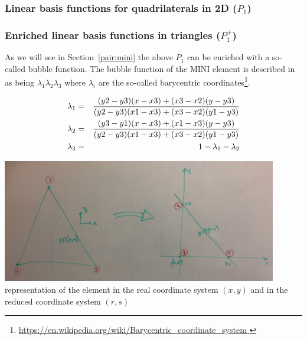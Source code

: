 \subsubsection{Linear basis functions for quadrilaterals in 2D ($P_1$)}\label{ss:lbfq2D}



\subsubsection{Enriched linear basis functions in triangles ($P_1^+$)}

As we will see in Section~\ref{pair:mini} the above $P_1$ can be enriched 
with a so-called bubble function.
The  bubble function of the MINI element 
is described in \cite{arbf84} as being $\lambda_1\lambda_2\lambda_3$
where $\lambda_i$ are the so-called barycentric 
coordinates\footnote{\url{https://en.wikipedia.org/wiki/Barycentric\_coordinate\_system }}.

\begin{eqnarray}
\lambda_1 &=& \frac{(y2-y3)(x-x3)+(x3-x2)(y-y3)}{(y2-y3)(x1-x3)+(x3-x2)(y1-y3)} \nonumber\\
\lambda_2 &=& \frac{(y3-y1)(x-x3)+(x1-x3)(y-y3)}{(y2-y3)(x1-x3)+(x3-x2)(y1-y3)} \nonumber\\
\lambda_3 &=& 1-\lambda_1-\lambda_2 \nonumber
\end{eqnarray}

\begin{center}
\includegraphics[width=12cm]{images/mini/minielement2}\\
{\small representation of the element in the real coordinate system $(x,y)$
and in the reduced coordinate system $(r,s)$}
\end{center}

